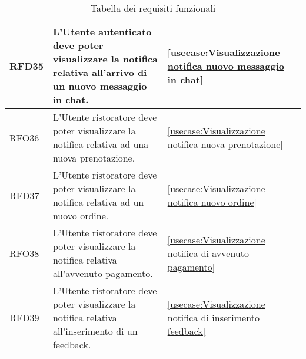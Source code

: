 \begin{table}[H]
\begin{tabularx}{\textwidth}{l|X|p{2cm}}
		\hline
		RFD35       & L'Utente autenticato deve poter visualizzare la notifica relativa all'arrivo di un nuovo messaggio in chat.       & \autoref{usecase:Visualizzazione notifica nuovo messaggio in chat}                    \\
		\hline
		RFO36       & L'Utente ristoratore deve poter visualizzare la notifica relativa ad una nuova prenotazione.                      & \autoref{usecase:Visualizzazione notifica nuova prenotazione}                               \\
		\hline
		RFD37       & L'Utente ristoratore deve poter visualizzare la notifica relativa ad un nuovo ordine.                             & \autoref{usecase:Visualizzazione notifica nuovo ordine}                               \\
		\hline
		RFO38       & L'Utente ristoratore deve poter visualizzare la notifica relativa all'avvenuto pagamento.                         & \autoref{usecase:Visualizzazione notifica di avvenuto pagamento}                      \\
		\hline
		RFD39       & L'Utente ristoratore deve poter visualizzare la notifica relativa all'inserimento di un feedback.                 & \autoref{usecase:Visualizzazione notifica di inserimento feedback}                    \\
	\end{tabularx}
	\caption{Tabella dei requisiti funzionali}
\end{table}


